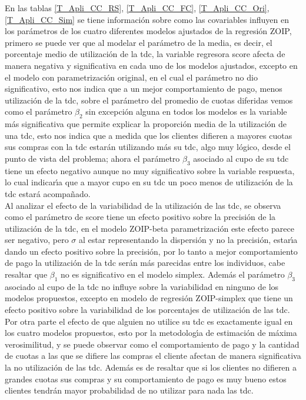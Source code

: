 En las tablas \ref{T_Apli_CC_RS}, \ref{T_Apli_CC_FC}, \ref{T_Apli_CC_Ori}, \ref{T_Apli_CC_Sim} se tiene informaci\'{o}n sobre como las covariables influyen en los par\'{a}metros de los cuatro diferentes modelos ajustados de la regresi\'{o}n ZOIP, primero se puede ver que al modelar el par\'{a}metro de la media, es decir, el porcentaje medio de utilizaci\'{o}n de la tdc, la variable regresora score afecta de manera negativa y significativa en cada uno de los modelos ajustados, excepto en el mo\-de\-lo con parametrizaci\'{o}n original, en el cual el par\'{a}metro no dio significativo, esto nos indica que a un mejor comportamiento de pago, menos utilizaci\'{o}n de la tdc, sobre el par\'{a}metro del promedio de cuotas diferidas vemos como el par\'{a}metro $\beta_2$ sin excepci\'{o}n alguna en todos los modelos es la variable m\'{a}s significativa que permite explicar la proporci\'{o}n media de la utilizaci\'{o}n de una tdc, esto nos indica que a medida que los clientes difieren a mayores cuotas sus compras con la tdc estar\'{a}n utilizando m\'{a}s su tdc, algo muy l\'{o}gico, desde el punto de vista del problema; ahora el par\'{a}metro $\beta_3$ asociado al cupo de su tdc tiene un efecto negativo aunque no muy significativo sobre la variable respuesta, lo cual indicar\'{\i}a que a mayor cupo en su tdc un poco menos de utilizaci\'{o}n de la tdc estar\'{a} acompa\~{n}ado.\\

Al analizar el efecto de la variabilidad de la utilizaci\'{o}n de las tdc, se observa como el par\'{a}metro de score tiene un efecto positivo sobre la precisi\'{o}n de la utilizaci\'{o}n de la tdc, en el modelo ZOIP-beta parametrizaci\'{o}n \cite{Stasinopoulos2} este efecto parece ser negativo, pero $\sigma$ al estar representando la dispersi\'{o}n y no la precisi\'{o}n, estar\'{\i}a dando un efecto positivo sobre la precisi\'{o}n, por lo tanto a mejor comportamiento de pago la utilizaci\'{o}n de la tdc ser\'{a}n m\'{a}s parecidas entre los individuos, cabe resaltar que $\beta_1$ no es significativo en el modelo simplex. Adem\'{a}s el par\'{a}metro $\beta_3$ asociado al cupo de la tdc no influye sobre la variabilidad en ninguno de los modelos propuestos, excepto en modelo de regresi\'{o}n ZOIP-simplex que tiene un efecto positivo sobre la variabilidad de los porcentajes de utilizaci\'{o}n de las tdc.\\

Por otra parte el efecto de que alguien no utilice su tdc es exactamente igual en los cuatro modelos propuestos, esto por la metodolog\'{\i}a de estimaci\'{o}n de m\'{a}xima verosimilitud, y se puede observar como el comportamiento de pago y la cantidad de cuotas a las que se difiere las compras el cliente afectan de manera significativa la no utilizaci\'{o}n de las tdc. Adem\'{a}s es de resaltar que si los clientes no difieren a grandes cuotas sus compras y su comportamiento de pago es muy bueno estos clientes tendr\'{a}n mayor probabilidad de no utilizar para nada las tdc.\\

